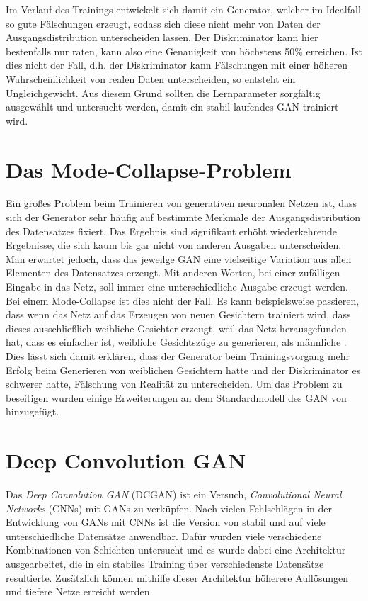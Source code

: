 \documentclass{hsflensburg}
\begin{document}
  Im Verlauf des Trainings entwickelt sich damit ein Generator, welcher im
  Idealfall so gute Fälschungen erzeugt, sodass sich diese nicht mehr von Daten
  der Ausgangsdistribution unterscheiden lassen. Der Diskriminator kann hier
  bestenfalls nur raten, kann also eine Genauigkeit von höchstens 50\%
  erreichen. Ist dies nicht der Fall, d.h. der Diskriminator kann Fälschungen
  mit einer höheren Wahrscheinlichkeit von realen Daten unterscheiden, so
  entsteht ein Ungleichgewicht. Aus diesem Grund sollten die Lernparameter
  sorgfältig ausgewählt und untersucht werden, damit ein stabil laufendes GAN
  trainiert wird.
  
  \section{Das Mode-Collapse-Problem}
  Ein großes Problem beim Trainieren von generativen neuronalen Netzen ist, dass
  sich der Generator sehr häufig auf bestimmte Merkmale der Ausgangsdistribution
  des Datensatzes fixiert. Das Ergebnis sind signifikant erhöht wiederkehrende
  Ergebnisse, die sich kaum bis gar nicht von anderen Ausgaben unterscheiden.
  Man erwartet jedoch, dass das jeweilge GAN eine vielseitige Variation aus
  allen Elementen des Datensatzes erzeugt. Mit anderen Worten, bei einer
  zufälligen Eingabe in das Netz, soll immer eine unterschiedliche Ausgabe
  erzeugt werden. Bei einem Mode-Collapse ist dies nicht der Fall. Es kann
  beispielsweise passieren, dass wenn das Netz auf das Erzeugen von neuen
  Gesichtern trainiert wird, dass dieses ausschließlich weibliche Gesichter
  erzeugt, weil das Netz herausgefunden hat, dass es einfacher ist, weibliche
  Gesichtszüge zu generieren, als männliche \cite{richardson2018gans}. Dies
  lässt sich damit erklären, dass der Generator beim Trainingsvorgang mehr
  Erfolg beim Generieren von weiblichen Gesichtern hatte und der Diskriminator
  es schwerer hatte, Fälschung von Realität zu unterscheiden. Um das Problem zu
  beseitigen wurden einige Erweiterungen an dem Standardmodell des GAN von
  \cite{goodfellow2014generative} hinzugefügt.

  \section{Deep Convolution GAN}
  Das \textit{Deep Convolution GAN} (DCGAN) ist ein Versuch,
  \textit{Convolutional Neural Networks} (CNNs) mit GANs zu verküpfen. Nach
  vielen Fehlschlägen in der Entwicklung von GANs mit CNNs ist die Version von
  \cite{radford2016unsupervised} stabil und auf viele unterschiedliche
  Datensätze anwendbar. Dafür wurden viele verschiedene Kombinationen von
  Schichten untersucht und es wurde dabei eine Architektur ausgearbeitet, die
  in ein stabiles Training über verschiedenste Datensätze resultierte.
  Zusätzlich können mithilfe dieser Architektur höherere Auflösungen und tiefere
  Netze erreicht werden.
\end{document}
